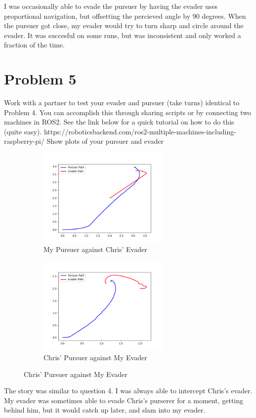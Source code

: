 \documentclass{article}
\begin{document}
\bigskip
\noindent I was occasionally able to evade the pursuer by having the evader uses proportional navigation, but offsetting the percieved angle by 90 degrees. When the pursuer got close, my evader would try to turn sharp and circle around the evader. It was succesful on some runs, but was inconsistent and only worked a fraction of the time.

\section*{Problem 5}

Work with a partner to test your evader and pursuer (take turns) identical to Problem 4. You can 
accomplish this through sharing scripts or by connecting two machines in ROS2. See the link below 
for a quick tutorial on how to do this (quite easy).
https://roboticsbackend.com/ros2-multiple-machines-including-raspberry-pi/
Show plots of your pursuer and evader

\bigskip

\begin{figure}[H]
\centering
\begin {subfigure}[b]{0.5\textwidth}
\includegraphics[width=0.7\textwidth]{question5a_my_pursuer.png}
\caption*{My Pursuer against Chris' Evader}
\label{fig:question5a}
\end{subfigure}
\begin {subfigure}[b]{0.5\textwidth}
\includegraphics[width=0.7\textwidth]{question5b_my_evader.png}
\caption*{Chris' Pursuer against My Evader}
\label{fig:question5b}
\end{subfigure}
\label{fig:question5}
\end{figure}

\bigskip
\noindent The story was similar to question 4. I was always able to intercept Chris's evader. My evader was sometimes able to evade Chris's purserer for a moment, getting behind him, but it would catch up later, and slam into my evader.
\end{document}

